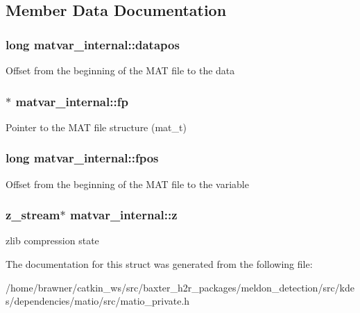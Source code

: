\subsection{Member Data Documentation}
\hypertarget{structmatvar__internal_afd3bfaab126a160bd6855563e1ea0a7e}{
\subsubsection[{datapos}]{\setlength{\rightskip}{0pt plus 5cm}long matvar\-\_\-internal\-::datapos}}\label{structmatvar__internal_afd3bfaab126a160bd6855563e1ea0a7e}
Offset from the beginning of the M\-A\-T file to the data \hypertarget{structmatvar__internal_a73f9faaa71fa20ca1cb48e32bcc67351}{
\subsubsection[{fp}]{$\ast$ matvar\-\_\-internal\-::fp}}\label{structmatvar__internal_a73f9faaa71fa20ca1cb48e32bcc67351}
Pointer to the M\-A\-T file structure (mat\-\_\-t) \hypertarget{structmatvar__internal_af64eef69fa4be3b068789d816dedd619}{
\subsubsection[{fpos}]{\setlength{\rightskip}{0pt plus 5cm}long matvar\-\_\-internal\-::fpos}}\label{structmatvar__internal_af64eef69fa4be3b068789d816dedd619}
Offset from the beginning of the M\-A\-T file to the variable \hypertarget{structmatvar__internal_a65fb91d70ebba50dd69f6433a5ef2461}{
\subsubsection[{z}]{\setlength{\rightskip}{0pt plus 5cm}z\-\_\-stream$\ast$ matvar\-\_\-internal\-::z}}\label{structmatvar__internal_a65fb91d70ebba50dd69f6433a5ef2461}
zlib compression state 

The documentation for this struct was generated from the following file\-:\begin{DoxyCompactItemize}
\item 
/home/brawner/catkin\-\_\-ws/src/baxter\-\_\-h2r\-\_\-packages/meldon\-\_\-detection/src/kdes/dependencies/matio/src/matio\-\_\-private.\-h\end{DoxyCompactItemize}
